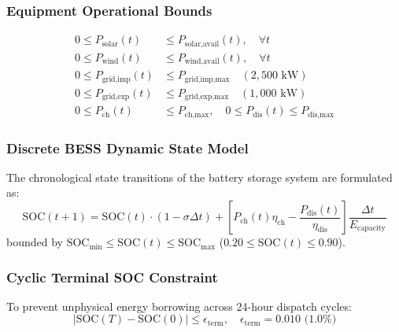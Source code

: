 \documentclass[conference]{IEEEtran}
\begin{document}
\subsubsection{Equipment Operational Bounds}
\begin{align}
0 \le P_{\text{solar}}(t) &\le P_{\text{solar,avail}}(t), \quad \forall t \\
0 \le P_{\text{wind}}(t) &\le P_{\text{wind,avail}}(t), \quad \forall t \\
0 \le P_{\text{grid,imp}}(t) &\le P_{\text{grid,imp,max}} \quad (2,500\text{ kW}) \\
0 \le P_{\text{grid,exp}}(t) &\le P_{\text{grid,exp,max}} \quad (1,000\text{ kW}) \\
0 \le P_{\text{ch}}(t) &\le P_{\text{ch,max}}, \quad 0 \le P_{\text{dis}}(t) \le P_{\text{dis,max}}
\end{align}

\subsubsection{Discrete BESS Dynamic State Model}
The chronological state transitions of the battery storage system are formulated as:
\begin{equation}
\text{SOC}(t+1) = \text{SOC}(t) \cdot (1 - \sigma \Delta t) + \left[ P_{\text{ch}}(t) \eta_{\text{ch}} - \frac{P_{\text{dis}}(t)}{\eta_{\text{dis}}} \right] \frac{\Delta t}{E_{\text{capacity}}}
\end{equation}
bounded by $\text{SOC}_{\min} \le \text{SOC}(t) \le \text{SOC}_{\max}$ ($0.20 \le \text{SOC}(t) \le 0.90$).

\subsubsection{Cyclic Terminal SOC Constraint}
To prevent unphysical energy borrowing across 24-hour dispatch cycles:
\begin{equation}
|\text{SOC}(T) - \text{SOC}(0)| \le \epsilon_{\text{term}}, \quad \epsilon_{\text{term}} = 0.010 \text{ (1.0\%)}
\end{equation}
\end{document}
